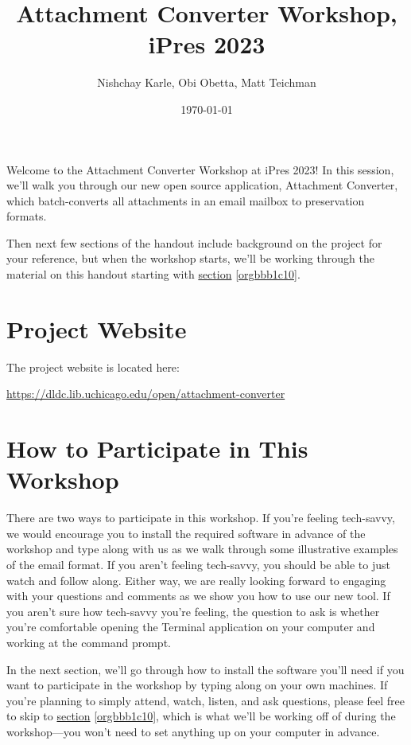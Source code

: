 \documentclass[11pt]{article}
\author{Nishchay Karle, Obi Obetta, Matt Teichman}
\date{\today}
\title{Attachment Converter Workshop, iPres 2023}
\begin{document}
\maketitle
Welcome to the Attachment Converter Workshop at iPres 2023!  In this
session, we'll walk you through our new open source application,
Attachment Converter, which batch-converts all attachments in an email
mailbox to preservation formats.

Then next few sections of the handout include background on the
project for your reference, but when the workshop starts, we'll be
working through the material on this handout starting with \hyperref[orgbbb1c10]{section}
\ref{orgbbb1c10}.

\section{Project Website}
\label{sec:org42679be}

The project website is located here:

\url{https://dldc.lib.uchicago.edu/open/attachment-converter}


\section{How to Participate in This Workshop}
\label{sec:org7264110}

There are two ways to participate in this workshop.  If you're feeling
tech-savvy, we would encourage you to install the required software in
advance of the workshop and type along with us as we walk through some
illustrative examples of the email format.  If you aren't feeling
tech-savvy, you should be able to just watch and follow along.  Either
way, we are really looking forward to engaging with your questions and
comments as we show you how to use our new tool. If you aren't sure
how tech-savvy you're feeling, the question to ask is whether you're
comfortable opening the Terminal application on your computer and
working at the command prompt.

In the next section, we'll go through how to install the software
you'll need if you want to participate in the workshop by typing along
on your own machines.  If you're planning to simply attend, watch,
listen, and ask questions, please feel free to skip to
\hyperref[orgbbb1c10]{section} \ref{orgbbb1c10}, which is what we'll be working off
of during the workshop---you won't need to set anything up on your
computer in advance.
\end{document}
